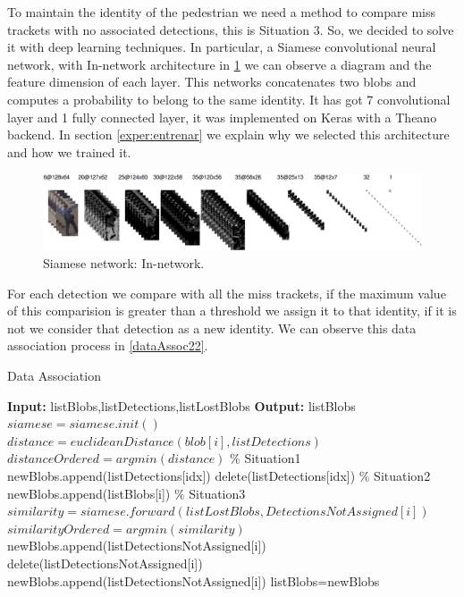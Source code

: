 To maintain the identity of the pedestrian we need a method to compare miss trackets with no associated detections, this is Situation 3. So, we decided to solve it with deep learning techniques. In particular, a Siamese convolutional neural network, with In-network architecture in \ref{saimss} we can observe a diagram and the feature dimension of each layer. This networks concatenates two blobs and computes a probability to belong to the same identity. It has got 7 convolutional layer and 1 fully connected layer, it was implemented on Keras with a Theano backend. In section \ref{exper:entrenar} we explain why we selected this architecture and how we trained it.



\begin{figure}[!]
\centering         
\includegraphics[width=16cm]{timesDiagram/network.png}
\caption{Siamese network: In-network.} \label{saimss}
\end{figure}


For each detection we compare with all the miss trackets, if the maximum value of this  comparision is greater than a threshold we assign it to that identity, if it is not we consider that detection as a new identity. We can observe this data association process in \ref{dataAssoc22}.



\begin{algorithm}
\caption{Data Association}\label{dataAssoc22}
\begin{algorithmic}[1]
\State \textbf{Input:} listBlobs,listDetections,listLostBlobs 
\State \textbf{Output:} listBlobs
\State $siamese = siamese.init()$
\State $distance = euclideanDistance(blob[i],listDetections)$
\State $distanceOrdered = argmin(distance)$
\State $\%$ Situation1
\State newBlobs.append(listDetections[idx])
\State delete(listDetections[idx])
\State $\%$ Situation2
\Else
\State newBlobs.append(listBlobs[i])
\EndIf
\EndFor
\State $\%$ Situation3
\State $similarity = siamese.forward(listLostBlobs,DetectionsNotAssigned[i])$
\State $similarityOrdered = argmin(similarity)$
\State newBlobs.append(listDetectionsNotAssigned[i])
\State delete(listDetectionsNotAssigned[i])
\Else
\State newBlobs.append(listDetectionsNotAssigned[i])
\EndIf
\EndFor
\EndProcedure
\State listBlobs=newBlobs
\end{algorithmic}
\end{algorithm}


